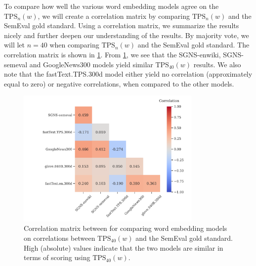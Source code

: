 To compare how well the various word embedding models agree on the $\text{TPS}_n(w)$, we will create a correlation matrix by comparing $\text{TPS}_n(w)$ and the SemEval gold standard. Using a correlation matrix, we summarize the results nicely and further deepen our understanding of the results. By majority vote, we will let $n=40$ when comparing $\text{TPS}_n(w)$ and the SemEval gold standard. The correlation matrix is shown in \cref{fig:correlation-matrix-tps-vs-gs}. From \cref{fig:correlation-matrix-tps-vs-gs}, we see that the SGNS-enwiki, SGNS-semeval and GoogleNews300 models yield similar $\text{TPS}_{40}(w)$ results. We also note that the fastText.TPS.300d model either yield no correlation (approximately equal to zero) or negative correlations, when compared to the other models.
\begin{figure}[H]
    \centering
    \includegraphics[width=0.8\textwidth]{thesis/figures/correlation-matrix-tps-vs-gs.pdf}
    \caption{Correlation matrix between for comparing word embedding models on correlations between $\text{TPS}_{40}(w)$ and the SemEval gold standard. High (absolute) values indicate that the two models are similar in terms of scoring using $\text{TPS}_{40}(w)$.}
    \label{fig:correlation-matrix-tps-vs-gs}
\end{figure}

